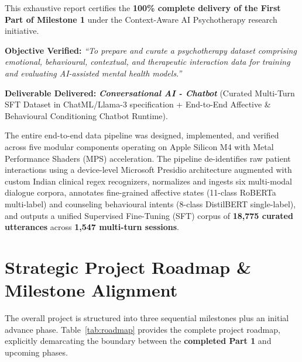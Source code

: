 \documentclass[11pt,a4paper]{article}
\begin{document}
\vspace{0.8em}

\begin{tcolorbox}[execBox={Executive Summary \& Milestone 1 Verification}]
This exhaustive report certifies the \textbf{100\% complete delivery of the First Part of Milestone 1} under the Context-Aware AI Psychotherapy research initiative. 

\textbf{Objective Verified:} \textit{``To prepare and curate a psychotherapy dataset comprising emotional, behavioural, contextual, and therapeutic interaction data for training and evaluating AI-assisted mental health models.''}

\textbf{Deliverable Delivered:} \textit{\textbf{Conversational AI - Chatbot}} (Curated Multi-Turn SFT Dataset in ChatML/Llama-3 specification + End-to-End Affective \& Behavioural Conditioning Chatbot Runtime).

The entire end-to-end data pipeline was designed, implemented, and verified across five modular components operating on Apple Silicon M4 with Metal Performance Shaders (MPS) acceleration. The pipeline de-identifies raw patient interactions using a device-level Microsoft Presidio architecture augmented with custom Indian clinical regex recognizers, normalizes and ingests six multi-modal dialogue corpora, annotates fine-grained affective states (11-class RoBERTa multi-label) and counseling behavioural intents (8-class DistilBERT single-label), and outputs a unified Supervised Fine-Tuning (SFT) corpus of \textbf{18,775 curated utterances} across \textbf{1,547 multi-turn sessions}.
\end{tcolorbox}

\newpage
\tableofcontents
\newpage

\section{Strategic Project Roadmap \& Milestone Alignment}

The overall project is structured into three sequential milestones plus an initial advance phase. Table~\ref{tab:roadmap} provides the complete project roadmap, explicitly demarcating the boundary between the \textbf{completed Part 1} and upcoming phases.
\end{document}
